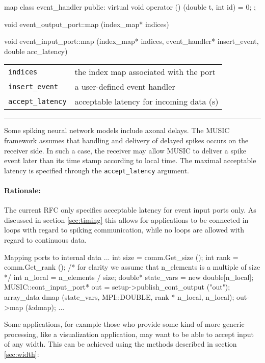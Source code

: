 \documentclass[a4paper]{report}
\makeatletter
\newenvironment{rationale}%
{\par\paragraph{Rationale:}}%
{\par}
\newenvironment{parameters}%
{\begin{tabular}{@{\hspace{2em}}lp{0.6\textwidth}}}%
{\end{tabular}\par\vspace{1mm}\par\hrule\par\vspace{5mm}}
\makeatother
\begin{document}
\begin{head}{map}
  class event_handler {
  public:
    virtual void operator () (double t, int id) = 0;
  };
  
  void event_output_port::map (index_map* indices)

  void event_input_port::map (index_map* indices,
                              event_handler* insert_event,
                              double acc_latency)
\end{head}
\begin{parameters}
  \lstinline|indices| & the index map associated with the port \\
  \lstinline|insert_event| & a user-defined event handler \\
  \lstinline|accept_latency| & acceptable latency for incoming data (s)
  \\
\end{parameters}

Some spiking neural network models include axonal delays.  The MUSIC
framework assumes that handling and delivery of delayed spikes occurs
on the receiver side.  In such a case, the receiver may allow MUSIC to
deliver a spike event later than its time stamp according to local
time.  The maximal acceptable latency is specified through the
\lstinline|accept_latency| argument.
  
\begin{rationale}
The current RFC only specifies acceptable latency for event input
ports only.  As discussed in section \ref{sec:timing} this allows for
applications to be connected in loops with regard to spiking
communication, while no loops are allowed with regard to continuous
data.
\end{rationale}

\begin{code}{Mapping ports to internal data\label{code:mapping}}
{
  ...
  int size = comm.Get_size ();
  int rank = comm.Get_rank ();
  /* for clarity we assume that n_elements is a multiple of size */
  int n_local = n_elements / size;
  double* state_vars = new double[n_local];
  MUSIC::cont_input_port* out = setup->publish_cont_output ("out");
  array_data dmap (state_vars, MPI::DOUBLE, rank * n_local, n_local);
  out->map (&dmap);
  ...
}
\end{code}

Some applications, for example those who provide some kind of more
generic processing, like a visualization application, may want to be
able to accept input of any width.  This can be achieved using the
methods described in section \ref{sec:width}:
\end{document}

